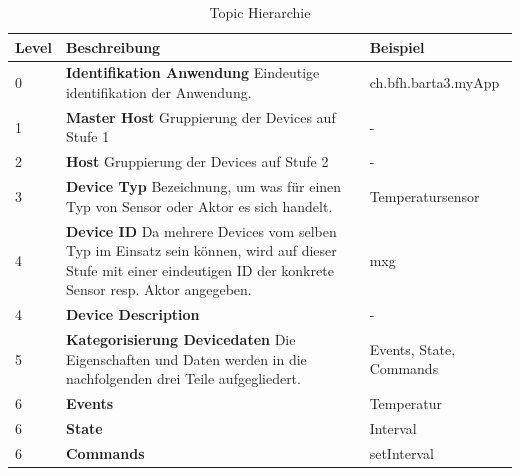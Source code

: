 \begin{table}[h!]
\begin{tabularx}{\textwidth}{|l|X|l|}

 \hline
 {\bf Level } & {\bf Beschreibung } & {\bf Beispiel } \\ 
 \hline
 0  &   \textbf{Identifikation Anwendung} \newline Eindeutige identifikation der Anwendung.  &    
  ch.bfh.barta3.myApp   \\ \hline
 
 1  &   \textbf{Master Host}  \newline Gruppierung der Devices auf Stufe 1  &     -   \\ \hline

 2  &   \textbf{Host} \newline Gruppierung der Devices auf Stufe 2   &   -   \\ \hline

 3  &   \textbf{Device Typ} \newline Bezeichnung, um was für einen Typ von Sensor oder Aktor es sich handelt.  &     Temperatursensor   \\ \hline

 4  &   \textbf{Device ID} \newline Da mehrere Devices vom selben Typ im Einsatz sein können, wird auf dieser Stufe mit einer eindeutigen ID der konkrete Sensor resp. Aktor angegeben.   &    mxg   \\ \hline
 
  4  &   \textbf{Device Description} \newline    &    -   \\ \hline

 5  &   \textbf{Kategorisierung Devicedaten} \newline  Die Eigenschaften und Daten werden in die nachfolgenden drei Teile aufgegliedert.  &     Events, State, Commands   \\ \hline

 6  &   \textbf{Events} \newline    &     Temperatur   \\ \hline

 6  &   \textbf{State} \newline    &     Interval   \\ \hline
 
 6  &   \textbf{Commands} \newline    &   setInterval   \\ \hline
 
\end{tabularx}
\caption{Topic Hierarchie}
\end{table}

